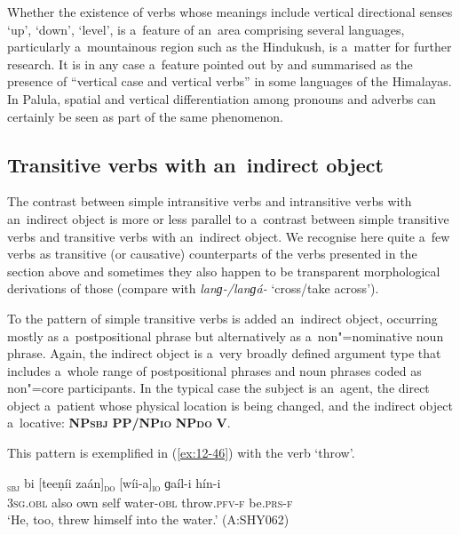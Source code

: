 Whether the existence of verbs whose meanings include vertical directional senses `up', `down', `level', is a~feature of an~area comprising several languages, particularly a~mountainous region such as the Hindukush, is a~matter for further research. It is in any case a~feature pointed out by \citet[9]{noonan2003} and summarised as the presence of ``vertical case and vertical verbs'' in some languages of the Himalayas. In Palula, spatial and vertical differentiation among pronouns and adverbs can certainly be seen as part of the same phenomenon. 


\subsection{Transitive verbs with an~indirect object}
\label{subsec:12-2-5}


The contrast between simple intransitive verbs and intransitive verbs with an~indirect object is more or less parallel to a~contrast between simple transitive verbs and transitive verbs with an~indirect object. We recognise here quite a~few verbs as transitive (or causative) counterparts of the verbs presented in the section above and sometimes they also happen to be transparent morphological derivations of those (compare with \textit{lanɡ-/lanɡá-} `cross/take across'). 


To the pattern of simple transitive verbs is added an~indirect object, occurring mostly as a~postpositional phrase but alternatively as a~non"=nominative noun phrase. Again, the indirect object is a~very broadly defined argument type that includes a~whole range of postpositional phrases and noun phrases coded as non"=core participants. In the typical case the subject is an~agent, the direct object a~patient whose physical location is being changed, and the indirect object a~locative: \textbf{NP\textsc{sbj}} \textbf{PP/NP\textsc{io}} \textbf{NP\textsc{do}} \textbf{V}. 


This pattern is exemplified in (\ref{ex:12-46}) with the verb `throw'.

\begin{exe}
\ex
\label{ex:12-46}
\gll [tíi]\textsubscript{\textsc{sbj}} bi [teeṇíi zaán]\textsubscript{\textsc{do}} [wíi-a]\textsubscript{\textsc{io}} ɡaíl-i hín-i \\
\textsc{3sg.obl} also own self water-\textsc{obl} throw.\textsc{pfv-f} be.\textsc{prs-f} \\
\glt `He, too, threw himself into the water.' (A:SHY062)
\end{exe}

